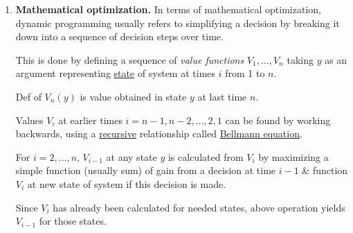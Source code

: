 \documentclass{article}
\begin{document}
\begin{enumerate}
	\item {\bf Mathematical optimization.} In terms of mathematical optimization, dynamic programming usually refers to simplifying a decision by breaking it down into a sequence of decision steps over time.
	
	This is done by defining a sequence of {\it value functions} $V_1,\ldots,V_n$ taking $y$ as an argument representing \href{https://en.wikipedia.org/wiki/State_variable}{state} of system at times $i$ from 1 to $n$.
	
	Def of $V_n(y)$ is value obtained in state $y$ at last time $n$.
	
	Values $V_i$ at earlier times $i = n - 1,n - 2,\ldots,2,1$ can be found by working backwards, using a \href{https://en.wikipedia.org/wiki/Recursion}{recursive} relationship called \href{https://en.wikipedia.org/wiki/Bellman_equation}{Bellmann equation}.
	
	For $i = 2,\ldots,n$, $V_{i-1}$ at any state $y$ is calculated from $V_i$ by maximizing a simple function (usually sum) of gain from a decision at time $i - 1$ \& function $V_i$ at new state of system if this decision is made.
	
	Since $V_i$ has already been calculated for needed states, above operation yields $V_{i-1}$ for those states.
	

\end{enumerate}
\end{document}
